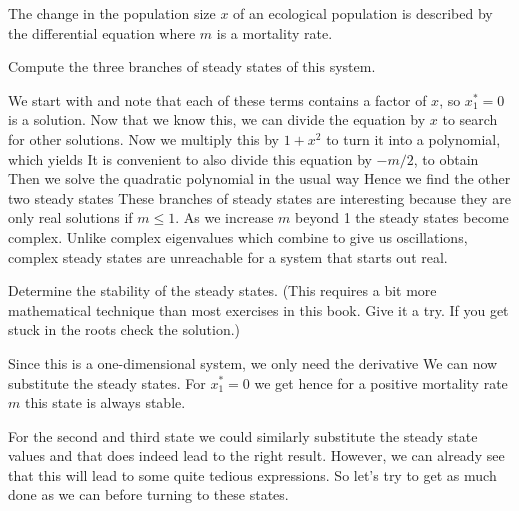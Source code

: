 
The change in the population size $x$ of an ecological population is described by the differential equation
where $m$ is a mortality rate.

\subquestion Compute the three branches of steady states of this system. 

\solution
We start with 
and note that each of these terms contains a factor of $x$, so $x_1^*=0$ is a solution. Now that we know this, we can divide the equation by $x$ to search for other solutions.
Now we multiply this by $1+x^2$ to turn it into a polynomial, which yields
It is convenient to also divide this equation by $-m/2$, to obtain 
Then we solve the quadratic polynomial in the usual way
Hence we find the other two steady states 
These branches of steady states are interesting because they are only real solutions if $m\le 1$. As we increase $m$ beyond 1 the steady states become complex. Unlike complex eigenvalues which combine to give us oscillations, complex steady states are unreachable for a system that starts out real. 

\subquestion 
Determine the stability of the steady states. (This requires a bit more mathematical technique than most exercises in this book. Give it a try. If you get stuck in the roots check the solution.)

\solution
Since this is a one-dimensional system, we only need the derivative 
We can now substitute the steady states. For $x_1^*=0$ we get 
hence for a positive mortality rate $m$ this state is always stable. 

For the second and third state we could similarly substitute the steady state values and that does indeed lead to the right result. However, we can already see that this will lead to some quite tedious expressions. 
So let's try to get as much done as we can before turning to these states. 

